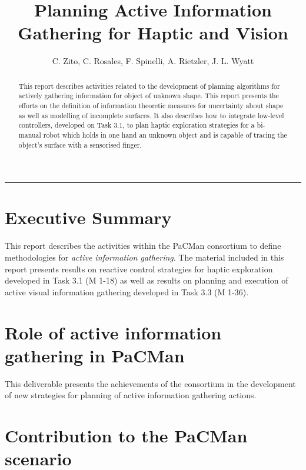 \documentclass[a4paper,11pt,pdf]{../templates/pacmanreport}
\title{Planning Active Information Gathering for Haptic and Vision}
\author{C. Zito, C. Rosales, F. Spinelli, A. Rietzler, J. L. Wyatt}
\begin{document}
\maketitle

\begin{abstract}
\noindent 
This report describes activities related to the development of planning algorithms for actively gathering information for object of unknown shape. This report presents the efforts on the definition of information theoretic measures for uncertainty about shape as well as modelling of incomplete surfaces. It also describes how to integrate low-level controllers, developed on Task 3.1, to plan haptic exploration strategies for a bi-manual robot which holds in one hand an unknown object and is capable of tracing the object's surface with a sensorised finger.  


\end{abstract}


\vspace{.2em}
\hrule

\footnotesize

\tableofcontents

\normalsize

\newpage

\section*{Executive Summary}

This report describes the activities within the PaCMan consortium to define methodologies for \emph{active information gathering}.
The material included in this report presents results on reactive control strategies for haptic exploration developed in Task 3.1 (M 1-18) as well as results on planning and execution of active visual information gathering developed in Task 3.3 (M 1-36).

\section*{Role of active information gathering in PaCMan}

This deliverable presents the achievements of the consortium in the development of new strategies for planning of active information gathering actions. 

\section*{Contribution to the PaCMan scenario}
\end{document}
